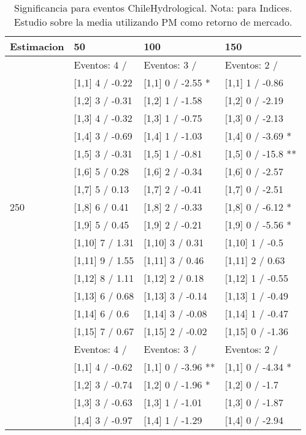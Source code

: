 \begin{table}

\caption{Significancia para eventos ChileHydrological. Nota: para Indices. Estudio sobre la media utilizando PM como retorno de mercado.}
\centering
\begin{tabular}[t]{llll}
\toprule
Estimacion & 50 & 100 & 150\\
\midrule
 & Eventos:  4 / & Eventos:  3 / & Eventos:  2 /\\
 & {}[1,1] 4  / -0.22 & {}[1,1] 0  / -2.55 * & {}[1,1] 1  / -0.86\\
 & {}[1,2] 3  / -0.31 & {}[1,2] 1  / -1.58 & {}[1,2] 0  / -2.19\\
 & {}[1,3] 4  / -0.32 & {}[1,3] 1  / -0.75 & {}[1,3] 0  / -2.13\\
 & {}[1,4] 3  / -0.69 & {}[1,4] 1  / -1.03 & {}[1,4] 0  / -3.69 *\\
\addlinespace
 & {}[1,5] 3  / -0.31 & {}[1,5] 1  / -0.81 & {}[1,5] 0  / -15.8 **\\
 & {}[1,6] 5  / 0.28 & {}[1,6] 2  / -0.34 & {}[1,6] 0  / -2.57\\
 & {}[1,7] 5  / 0.13 & {}[1,7] 2  / -0.41 & {}[1,7] 0  / -2.51\\
250 & {}[1,8] 6  / 0.41 & {}[1,8] 2  / -0.33 & {}[1,8] 0  / -6.12 *\\
 & {}[1,9] 5  / 0.45 & {}[1,9] 2  / -0.21 & {}[1,9] 0  / -5.56 *\\
\addlinespace
 & {}[1,10] 7  / 1.31 & {}[1,10] 3  / 0.31 & {}[1,10] 1  / -0.5\\
 & {}[1,11] 9  / 1.55 & {}[1,11] 3  / 0.46 & {}[1,11] 2  / 0.63\\
 & {}[1,12] 8  / 1.11 & {}[1,12] 2  / 0.18 & {}[1,12] 1  / -0.55\\
 & {}[1,13] 6  / 0.68 & {}[1,13] 3  / -0.14 & {}[1,13] 1  / -0.49\\
 & {}[1,14] 6  / 0.6 & {}[1,14] 3  / -0.08 & {}[1,14] 1  / -0.47\\
\addlinespace
 & {}[1,15] 7  / 0.67 & {}[1,15] 2  / -0.02 & {}[1,15] 0  / -1.36\\
 & Eventos:  4 / & Eventos:  3 / & Eventos:  2 /\\
 & {}[1,1] 4  / -0.62 & {}[1,1] 0  / -3.96 ** & {}[1,1] 0  / -4.34 *\\
 & {}[1,2] 3  / -0.74 & {}[1,2] 0  / -1.96 * & {}[1,2] 0  / -1.7\\
 & {}[1,3] 3  / -0.63 & {}[1,3] 1  / -1.01 & {}[1,3] 0  / -1.87\\
\addlinespace
 & {}[1,4] 3  / -0.97 & {}[1,4] 1  / -1.29 & {}[1,4] 0  / -2.94\\

\end{tabular}
\end{table}
